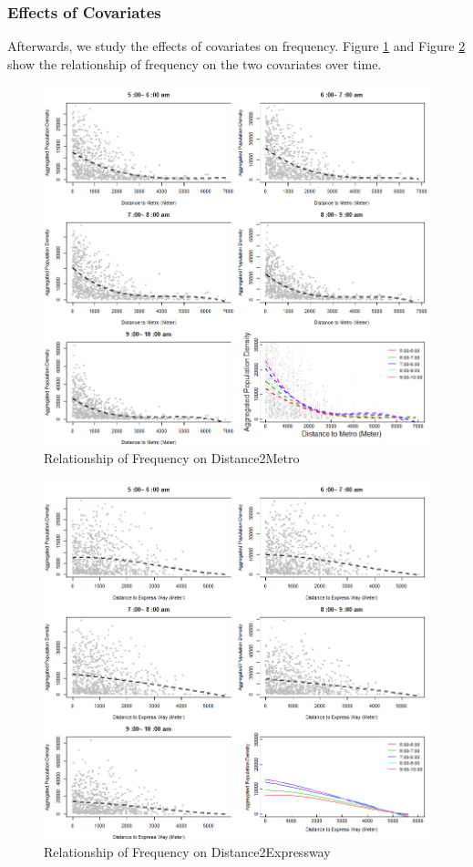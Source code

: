 \documentclass[hidelinks,12pt]{article}
\begin{document}
	\subsubsection{Effects of Covariates}
	Afterwards, we study the effects of covariates on frequency. Figure \ref{fig:disme} and Figure \ref{fig:disex} show the relationship of frequency on the two covariates over time.
	\begin{figure}[!ht]
		\includegraphics[width=\textwidth]{dist2metro.png}
		\caption{Relationship of Frequency on Distance2Metro \label{fig:disme}}
	\end{figure}
\FloatBarrier
	\begin{figure}[!ht]
		\includegraphics[width=\textwidth]{dist2express.png}
		\caption{Relationship of Frequency on Distance2Expressway \label{fig:disex}}
	\end{figure}
\FloatBarrier
	
\end{document}
